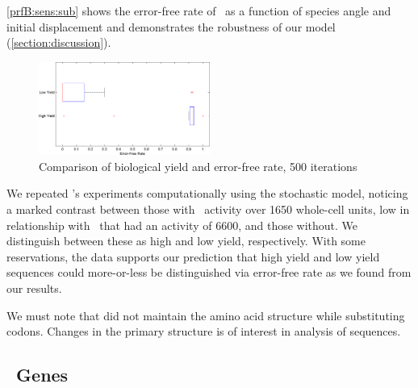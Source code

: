 \documentclass[12pt]{article}
\numberwithin{equation}{section}
\begin{document}
\autoref{prfB:sens:sub} shows the error-free rate of \prfB\ as a function
of species angle and initial displacement and demonstrates the
robustness of our model (\autoref{section:discussion}).

\begin{figure}
  \caption{Comparison of biological yield and error-free rate, 500 iterations}
  \label{weissboxplot}
  \includegraphics[width=0.5\textwidth]{histograms/weissbox}
\end{figure}

We repeated \citeauthor{weiss87}'s experiments computationally
using the stochastic model, noticing a marked contrast between those
with \bgals\ activity over 1650 whole-cell units, low in
relationship with \prfB\ that had an activity of 6600, and those
without. We distinguish between these as high and low yield, respectively.
With some reservations, the data supports our prediction that high yield
and low yield sequences could more-or-less be distinguished via
error-free rate as we found from our results.

We must note that \citeauthor{weiss87} did not maintain the amino acid structure
while substituting codons.  Changes in the primary structure is of interest in
analysis of sequences.

\subsection{\ecoli\ Genes}
\begin{cfigure}
  \caption{Investigating a large sample of \ecoli\ genes}
  \quad
\end{cfigure}
\end{document}
